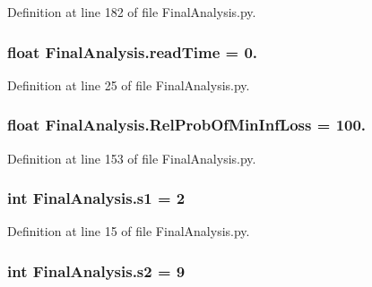 Definition at line 182 of file Final\-Analysis.\-py.

\hypertarget{namespace_final_analysis_a52de26ab1dba066ec7d2b10dd3bd8544}{
\subsubsection[{read\-Time}]{\setlength{\rightskip}{0pt plus 5cm}float Final\-Analysis.\-read\-Time = 0.}}\label{namespace_final_analysis_a52de26ab1dba066ec7d2b10dd3bd8544}


Definition at line 25 of file Final\-Analysis.\-py.

\hypertarget{namespace_final_analysis_a503e1ab9c53535c8cf3182b5bd683239}{
\subsubsection[{Rel\-Prob\-Of\-Min\-Inf\-Loss}]{\setlength{\rightskip}{0pt plus 5cm}float Final\-Analysis.\-Rel\-Prob\-Of\-Min\-Inf\-Loss = 100.}}\label{namespace_final_analysis_a503e1ab9c53535c8cf3182b5bd683239}


Definition at line 153 of file Final\-Analysis.\-py.

\hypertarget{namespace_final_analysis_a8237fbcf96157871ca15161b8c911d6a}{
\subsubsection[{s1}]{\setlength{\rightskip}{0pt plus 5cm}int Final\-Analysis.\-s1 = 2}}\label{namespace_final_analysis_a8237fbcf96157871ca15161b8c911d6a}


Definition at line 15 of file Final\-Analysis.\-py.

\hypertarget{namespace_final_analysis_a6e5fab082186d13ccafedfe0f8a36fd3}{
\subsubsection[{s2}]{\setlength{\rightskip}{0pt plus 5cm}int Final\-Analysis.\-s2 = 9}}\label{namespace_final_analysis_a6e5fab082186d13ccafedfe0f8a36fd3}


